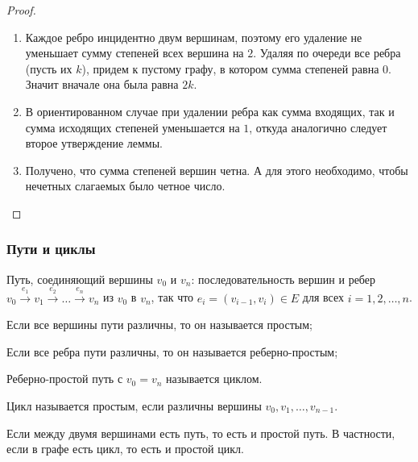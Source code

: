 \begin{proof}
    \begin{enumerate}
        \item Каждое ребро инцидентно двум вершинам, поэтому его удаление не уменьшает сумму степеней всех вершина на $2$. Удаляя по очереди все ребра (пусть их $k$), придем к пустому графу, в котором сумма степеней равна $0$. Значит вначале она была равна $2k$.
        
        \item В ориентированном случае при удалении ребра как сумма входящих, так и сумма исходящих степеней уменьшается на $1$, откуда аналогично следует второе утверждение леммы. 
        
        \item Получено, что сумма степеней вершин четна. А для этого необходимо, чтобы нечетных слагаемых было четное число.
    \end{enumerate}
\end{proof}

\subsubsection*{Пути и циклы}

\begin{defn}
    Путь, соединяющий вершины $v_0$ и $v_n$: последовательность вершин и ребер $v_0 \overset{e_1}{\to} v_1 \overset{e_2}{\to} \dots \overset{e_n}{\to} v_n$ из $v_0$ в $v_n$, так что $e_i = (v_{i - 1}, v_i) \in E$ для всех $i = 1, 2, \ldots, n$.
\end{defn}

\begin{defn}
    Если все вершины пути различны, то он называется простым;
\end{defn}

\begin{defn}
    Если все ребра пути различны, то он называется реберно-простым;
\end{defn}

\begin{defn}
    Реберно-простой путь с $v_0 = v_n$ называется циклом.
\end{defn}

\begin{defn}
    Цикл называется простым, если различны вершины $v_0, v_1, \ldots, v_{n - 1}$.
\end{defn}

\begin{notice}
    Если между двумя вершинами есть путь, то есть и простой путь. В частности, если в графе есть цикл, то есть и простой цикл.
\end{notice}

